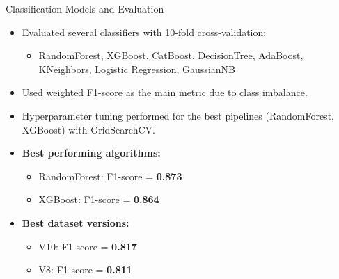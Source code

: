 \documentclass{beamer}
\begin{document}
\begin{frame}{Classification Models and Evaluation}
    \begin{itemize}
        \item Evaluated several classifiers with 10-fold cross-validation:
        \begin{itemize}
            \item RandomForest, XGBoost, CatBoost, DecisionTree, AdaBoost, KNeighbors, Logistic Regression, GaussianNB
        \end{itemize}
        \item Used weighted F1-score as the main metric due to class imbalance.
        \item Hyperparameter tuning performed for the best pipelines (RandomForest, XGBoost) with GridSearchCV.
        \item \textbf{Best performing algorithms:}
        \begin{itemize}
            \item RandomForest: F1-score = \textbf{0.873}
            \item XGBoost: F1-score = \textbf{0.864}
        \end{itemize}
        \item \textbf{Best dataset versions:}
        \begin{itemize}
            \item V10: F1-score = \textbf{0.817}
            \item V8: F1-score = \textbf{0.811}
        \end{itemize}
    \end{itemize}
\end{frame}
\end{document}
